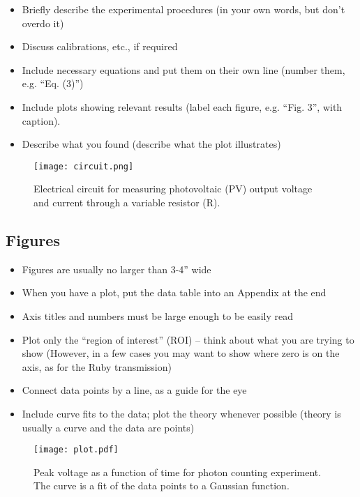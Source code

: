 \documentclass[aps,prl,reprint]{revtex4-2}
\begin{document}
\begin{itemize}
\item Briefly describe the experimental procedures (in your own words, but don’t overdo it)
\item Discuss calibrations, etc., if required
\item Include necessary equations and put them on their own line (number them, e.g. “Eq. (3)”)
\item Include plots showing relevant results (label each figure, e.g. “Fig. 3”, with caption).
\item Describe what you found (describe what the plot illustrates)
\end{itemize}

\begin{figure}
\texttt{[image: circuit.png]}
\caption{\label{circuitdiagram}Electrical circuit for measuring photovoltaic (PV) output voltage and current through a variable resistor (R).}
\end{figure}


\subsection{Figures}

\begin{itemize}
\item Figures are usually no larger than 3-4” wide
\item When you have a plot, put the data table into an Appendix at the end
\item Axis titles and numbers must be large enough to be easily read
\item Plot only the “region of interest” (ROI) – think about what you are trying to show (However, in a few cases you may want to show where zero is on the axis, as for the Ruby transmission)
\item Connect data points by a line, as a guide for the eye
\item Include curve fits to the data; plot the theory whenever possible (theory is usually a curve and the data are points)
\end{itemize}

\begin{figure}
\texttt{[image: plot.pdf]}
\caption{\label{plot}Peak voltage as a function of time for photon counting experiment. The curve is a fit of the data points to a Gaussian function.}
\end{figure}
\end{document}
